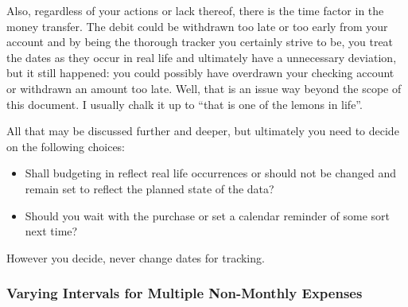 Also, regardless of your actions or lack thereof, there is the time factor in the money transfer.
The debit could be withdrawn too late or too early from your account and by being the thorough tracker you certainly strive to be, you treat the dates as they occur in real life and ultimately have a unnecessary deviation, but it still happened: you could possibly have overdrawn your checking account or withdrawn an amount too late.
Well, that is an issue way beyond the scope of this document.
I usually chalk it up to ``that is one of the lemons in life''.

All that may be discussed further and deeper, but ultimately you need to decide on the following choices:
\begin{itemize}
	\item Shall budgeting in \tfn reflect real life occurrences or should \tfn not be changed and remain set to reflect the planned state of the data?
	\item Should you wait with the purchase or set a calendar reminder of some sort next time?
\end{itemize}
\begin{specialnote}
	However you decide, never change dates for tracking.
\end{specialnote}

\subsubsection{Varying Intervals for Multiple Non-Monthly Expenses}
\label{subsubsec:multiple-non-monthly-expenses}

